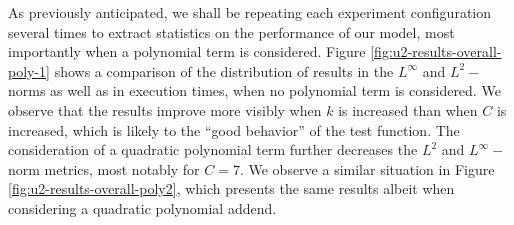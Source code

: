 \documentclass[12pt]{report} %
\begin{document}
As previously anticipated, we shall be repeating each experiment configuration several times to extract statistics on the performance of our model, most importantly when a polynomial term is considered. Figure \ref{fig:u2-results-overall-poly-1} shows a comparison of the distribution of results in the $L^\infty$ and $L^2-$norms as well as in execution times, when no polynomial term is considered. We observe that the results improve more visibly when $k$ is increased than when $C$ is increased, which is likely to the ``good behavior'' of the test function. The consideration of a quadratic polynomial term further decreases the $L^2$ and $L^\infty-$norm metrics, most notably for $C=7$. We observe a similar situation in Figure \ref{fig:u2-results-overall-poly2}, which presents the same results albeit when considering a quadratic polynomial addend.
\end{document}
